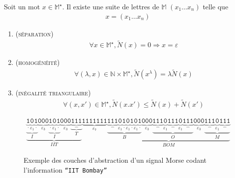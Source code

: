 \documentclass[twocolumn,pre,floats,aps,amsmath,amssymb]{revtex4}
\newenvironment{proof}[1][D\'emonstration.]{\begin{trivlist}
\item[\hskip \labelsep {\bfseries #1}]}{\end{trivlist}}
\begin{document}
\begin{proof}
  Soit un mot $x \in \mathbb{M}^{\star}$. Il existe une suite de lettres de $\mathbb{M}$ $(x_1 \dots x_n)$ telle que 
  \begin{eqnarray*}
    x = (x_1 \dots x_n)
  \end{eqnarray*}
  \begin{enumerate}
    \item{(\textsc{s\'eparation})
      \begin{eqnarray*}
        \forall x \in \mathbb{M}^{\star}, \widetilde{N}(x) = 0 \Rightarrow x = \varepsilon
      \end{eqnarray*}
    }
    \item{(\textsc{homog\'en\'eit\'e})
      \begin{eqnarray*}
        \forall (\lambda, x) \in \mathbb{N} \times \mathbb{M}^{\star}, \widetilde{N}(x^{\lambda}) = \lambda \widetilde{N}(x)
      \end{eqnarray*}
    }
    \item{(\textsc{in\'egalit\'e triangulaire})
      \begin{eqnarray*}
        \forall (x, x') \in \mathbb{M}^{\star}, \widetilde{N}(x.x') \leq \widetilde{N}(x) + \widetilde{N}(x')
      \end{eqnarray*}
    }
  \end{enumerate}
\end{proof}

\begin{figure}[]
  \begin{eqnarray*}
    \underbrace{\underbrace{\underbrace{\texttt{1}}_{.} \underbrace{\texttt{0}}_{\varepsilon_1} \underbrace{\texttt{1}}_{.}}_{I} \underbrace{\texttt{000}}_{\varepsilon_3} \underbrace{\underbrace{\texttt{1}}_{.} \underbrace{\texttt{0}}_{\varepsilon_1} \underbrace{\texttt{1}}_{.}}_{I} \underbrace{\texttt{000}}_{\varepsilon_3} \underbrace{\underbrace{\texttt{111}}_{-}}_{T}}_{IIT}
    \underbrace{\texttt{1111111}}_{\varepsilon_7}
    \underbrace{\underbrace{\underbrace{\texttt{111}}_{-} \underbrace{\texttt{0}}_{\varepsilon_1} \underbrace{\texttt{1}}_{.} \underbrace{\texttt{0}}_{\varepsilon_1} \underbrace{\texttt{1}}_{.} \underbrace{\texttt{0}}_{\varepsilon_1} \underbrace{\texttt{1}}_{.}}_{B} \underbrace{\texttt{000}}_{\varepsilon_3} \underbrace{\underbrace{\texttt{111}}_{-} \underbrace{\texttt{0}}_{\varepsilon_1} \underbrace{\texttt{111}}_{-} \underbrace{\texttt{0}}_{\varepsilon_1} \underbrace{\texttt{111}}_{-}}_{O} \underbrace{\texttt{000}}_{\varepsilon_3} \underbrace{\underbrace{\texttt{111}}_{-} \underbrace{\texttt{0}}_{\varepsilon_1} \underbrace{\texttt{111}}_{-}}_{M}}_{BOM}
  \end{eqnarray*}  
  \caption{Exemple des couches d'abstraction d'un signal Morse codant l'information \texttt{``IIT Bombay''}}
  \label{fig:exemple_signal_morse}
\end{figure}
\end{document}
